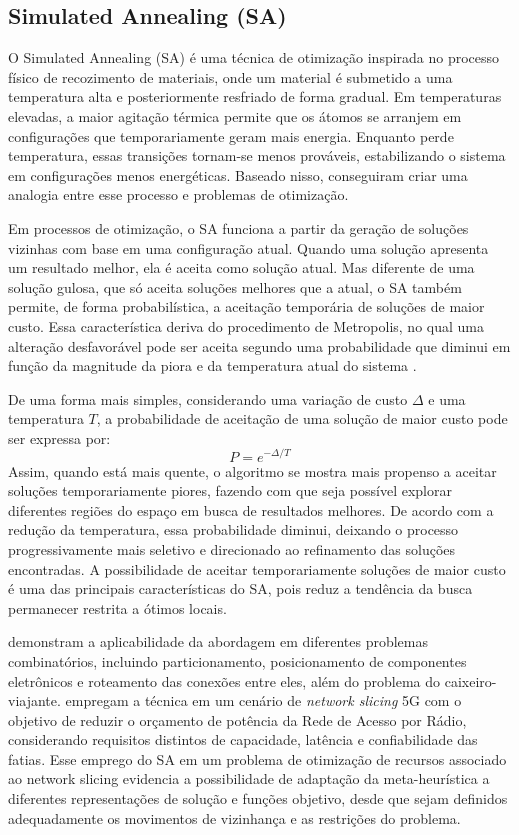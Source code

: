 \subsection{Simulated Annealing (SA)}

O Simulated Annealing (SA) é uma técnica de otimização inspirada no processo físico de recozimento de materiais, onde um material é submetido a uma temperatura alta e posteriormente resfriado de forma gradual. Em temperaturas elevadas, a maior agitação térmica permite que os átomos se arranjem em configurações que temporariamente geram mais energia. Enquanto perde temperatura, essas transições tornam-se menos prováveis, estabilizando o sistema em configurações menos energéticas. Baseado nisso,  conseguiram criar uma analogia entre esse processo e problemas de otimização. 

Em processos de otimização, o SA funciona a partir da geração de soluções vizinhas com base em uma configuração atual. Quando uma solução apresenta um resultado melhor, ela é aceita como solução atual. Mas diferente de uma solução gulosa, que só aceita soluções melhores que a atual, o SA também permite, de forma probabilística, a aceitação temporária de soluções de maior custo. Essa característica deriva do procedimento de Metropolis, no qual uma alteração desfavorável pode ser aceita segundo uma probabilidade que diminui em função da magnitude da piora e da temperatura atual do sistema \cite{kirkpatrick1983optimization}.

De uma forma mais simples, considerando uma variação de custo \(\Delta\) e uma temperatura \(T\), a probabilidade de aceitação de uma solução de maior custo pode ser expressa por:
\[
P = e^{-\Delta/T}
\]
Assim, quando está mais quente, o algoritmo se mostra mais propenso a aceitar soluções temporariamente piores, fazendo com que seja possível explorar diferentes regiões do espaço em busca de resultados melhores. De acordo com a redução da temperatura, essa probabilidade diminui, deixando o processo progressivamente mais seletivo e direcionado ao refinamento das soluções encontradas. A possibilidade de aceitar temporariamente soluções de maior custo é uma das principais características do SA, pois reduz a tendência da busca permanecer restrita a ótimos locais. 

 demonstram a aplicabilidade da abordagem em diferentes problemas combinatórios, incluindo particionamento, posicionamento de componentes eletrônicos e roteamento das conexões entre eles, além do problema do caixeiro-viajante.  empregam a técnica em um cenário de \textit{network slicing} 5G com o objetivo de reduzir o orçamento de potência da Rede de Acesso por Rádio, considerando requisitos distintos de capacidade, latência e confiabilidade das fatias. Esse emprego do SA em um problema de otimização de recursos associado ao network slicing evidencia a possibilidade de adaptação da meta-heurística a diferentes representações de solução e funções objetivo, desde que sejam definidos adequadamente os movimentos de vizinhança e as restrições do problema.




